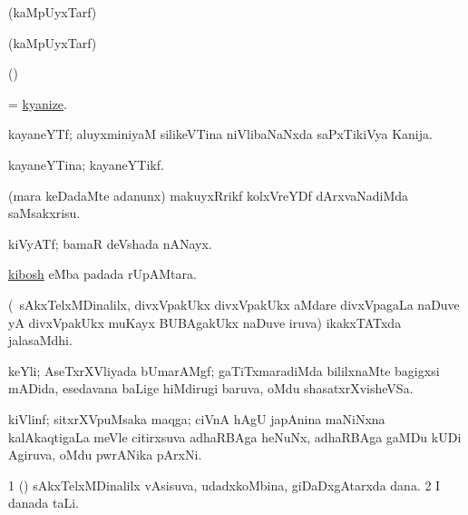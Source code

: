 \bentry
{}
\gl{\saMkiSx}
\bmng
{} 
\emng
\eentry

\bentry
{}
\gl{\saMkiSx}
\bmng
(kaMpUyxTarf)  
\emng
\eentry

\bentry
{}
\gl{\saMkiSx}
\bmng
(kaMpUyxTarf)  
\emng
\eentry

\bentry
{}
\gl{\saMkiSx}
\bmng
(\ame)  
\emng
\eentry

\bentry
{}
\gl{\saMkiSx}
\bmng
{} 
\emng
\eentry

\bentry
{}
\gl{\sakirx}
\bmng
 = \hyperlink{kyanize}{kyanize}. 
\emng
\eentry

\bentry
{}
\gl{\nA}
\bmng
kayaneYTf; aluyxminiyaM silikeVTina niVlibaNaNxda saPxTikiVya Kanija. 
\emng
\eentry

\bentry
{}
\gl{\gu}
\bmng
kayaneYTina; kayaneYTikf. 
\emng
\eentry

\bentry
{}
\gl{\sakirx}
\bmng
(mara keDadaMte adanunx) makuyxRrikf kolxVreYDf dArxvaNadiMda saMsakxrisu. 
\emng
\eentry

\bentry
{}
\gl{\nA}
\bmng
kiVyATf; bamaR deVshada nANayx. 
\emng
\eentry

\bentry
{}
\gl{\nA}
\bmng
 \hyperlink{kibosh}{kibosh} eMba padada rUpAMtara. 
\emng
\eentry

\bentry
{}
\gl{\nA}
\bmng
(\pa\ sAkxTelxMDinalilx, divxVpakUkx divxVpakUkx aMdare divxVpagaLa naDuve yA divxVpakUkx muKayx BUBAgakUkx naDuve iruva) ikakxTATxda jalasaMdhi. 
\emng
\eentry

\bentry
{}
\gl{\nA}
\bmng
keYli; AseTxrXVliyada bUmarAMgf; gaTiTxmaradiMda bililxnaMte bagigxsi mADida, esedavana baLige hiMdirugi baruva, oMdu shasatxrXvisheVSa. 
\emng
\eentry

\bentry
{}
\gl{\nA}
\bmng
kiVlinf; sitxrXVpuMsaka maqga; ciVnA hAgU japAnina maNiNxna kalAkaqtigaLa meVle citirxsuva adhaRBAga heNuNx, adhaRBAga gaMDu kUDi Agiruva, oMdu pwrANika pArxNi. 
\emng
\eentry

\bentry
{}
\gl{\nA}
\bmng
\bnum
\num{1} (\birx) sAkxTelxMDinalilx vAsisuva, udadxkoMbina, giDaDxgAtarxda dana. 
\num{2} I danada taLi. 
\enum
\emng
\eentry

